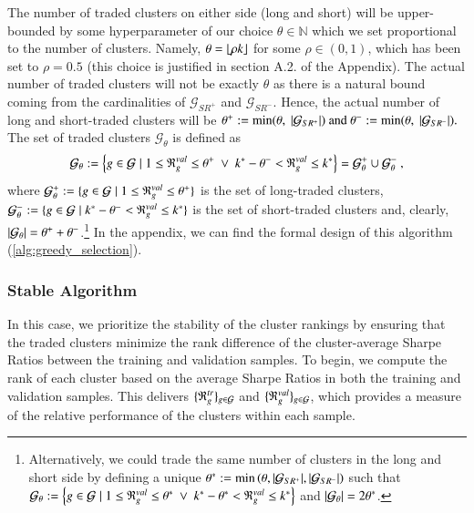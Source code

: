 \mx
The number of traded clusters on either side (long and short) will be upper-bounded by some hyperparameter of our choice $\theta \in \mathbb{N}$
which we set proportional to the number of clusters. Namely, $\theta =\lfloor \rho k \rfloor$ for some $\rho\in(0,1)$, which has been set to $\rho=0.5$ (this choice is justified in section A.2. of the Appendix).
%
The actual number of traded clusters will not be exactly $\theta$ as there is a natural bound coming from the cardinalities of $\mathcal G_{SR^+}$ and $\mathcal G_{SR^-}$. Hence, the actual number of long and short-traded clusters will be
$
\theta^+ := \min(\theta, ~|\mathcal G_{SR^+}|)
~\text{and}~
\theta^- := \min(\theta, ~|\mathcal G_{SR^-}|)
.
$
The set of traded clusters $\mathcal G_{\theta}$ is defined as
$$
\mathcal{G}_\theta := 
\left\{
g \in \mathcal G 
\mid 
1\leq \mathfrak{R}_g^{val} \leq \theta^+
~\vee~ 
k^* -\theta^- < \mathfrak{R}_g^{val} \leq k^*
\right\} 
= 
\mathcal{G}_{\theta}^+ \cup \mathcal{G}_{\theta}^-
~,
$$
where
$
\mathcal{G}_{\theta}^+ := 
\{ g \in\mathcal{G} \mid 
1\leq \mathfrak{R}_g^{val} \leq \theta^+
\}
$
is the set of long-traded clusters,
$
\mathcal{G}_{\theta}^- := 
\{ g \in\mathcal{G} \mid 
k^*-\theta^-
< \mathfrak{R}_g^{val} \leq 
k^*
\}
$
is the set of short-traded clusters 
and, clearly, $\left|\mathcal{G}_{\theta}\right|=\theta^+ + \theta^- $.\footnote{
Alternatively, we could trade the same number of clusters in the long and short side by defining a unique 
$
\theta^* := \min\left(\theta, |\mathcal G_{SR^+}|, |\mathcal G_{SR^-}| \right)
$
such that
$
\mathcal{G}_\theta := 
\left\{
g \in \mathcal G 
\mid 
1\leq \mathfrak{R}_g^{val} \leq \theta^*
~\vee~ 
k^*-\theta^* < \mathfrak{R}_g^{val} \leq k^*
\right\} 
$
and 
$\left|\mathcal{G}_\theta\right|=2\theta^*$.
}
In the appendix, we can find the formal design of this algorithm (\cref{alg:greedy_selection}).

\subsubsection{Stable Algorithm}

In this case, we prioritize the stability of the cluster rankings by ensuring that the traded clusters minimize the rank difference of the cluster-average Sharpe Ratios between the training and validation samples. 
To begin, we compute the rank of each cluster based on the average Sharpe Ratios in both the training and validation samples. This delivers $\{\mathfrak{R}_g^{tr}\}_{g\in\mathcal{G}}$ and $\{\mathfrak{R}_g^{val}\}_{g\in\mathcal{G}}$, which provides a measure of the relative performance of the clusters within each sample.


